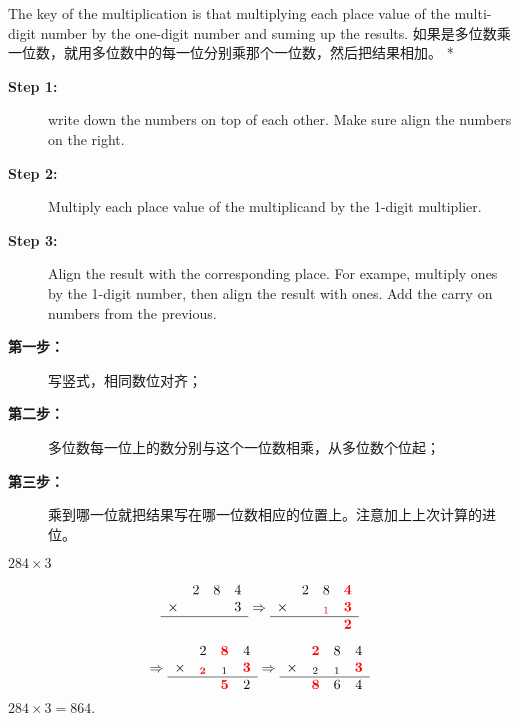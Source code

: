 \begin{paracol}{2}
The key of the multiplication is that multiplying each place value of the multi-digit number by the one-digit number and suming up the results.
\switchcolumn[1]
如果是多位数乘一位数，就用多位数中的每一位分别乘那个一位数，然后把结果相加。
\switchcolumn[0]*
\begin{description}
\item [{\bf Step 1:} ] write down the numbers on top of each other. Make sure  align the numbers on the right.
\item [{\bf Step 2:} ] Multiply each place value of the multiplicand by the 1-digit multiplier. 
\item [{\bf Step 3:} ] Align the result with the corresponding place. For exampe, multiply ones by the 1-digit number, then align the result with ones. Add the carry on numbers from the previous.
\end{description}
\switchcolumn[1]
\begin{description}
\item [{\bf 第一步：} ] 写竖式，相同数位对齐；
\item [{\bf 第二步：} ] 多位数每一位上的数分别与这个一位数相乘，从多位数个位起；
\item [{\bf 第三步：} ] 乘到哪一位就把结果写在哪一位数相应的位置上。注意加上上次计算的进位。
\end{description}
\end{paracol}

\begin{example}
$284\times 3$
\end{example}
\begin{solution}
$$
\begin{array}{lccc}
&2&8&4\\
\times&&&3\\
\hline
&&&
\end{array}
\Rightarrow
\begin{array}{lccc}
&2&8&{\color{red} \bm 4}\\
\times&&_{\color{red}1}&{\color{red} \bm 3}\\
\hline
&&&{\color{red} \bm 2}
\end{array}
$$
$$
\Rightarrow
\begin{array}{lccc}
&2&{\color{red} \bm 8}&4\\
\times&_{\color{red} \bm 2}&_{1}&{\color{red} \bm 3}\\
\hline
&&{\color{red} \bm 5}&2\\
\end{array}
\Rightarrow
\begin{array}{lccc}
&{\color{red} \bm2}& 8&4\\
\times&_{2}&_{1}&{\color{red} \bm 3}\\
\hline
&{\color{red} \bm 8}& 6&4
\end{array}
$$
$284\times 3= 864.$
\end{solution}

